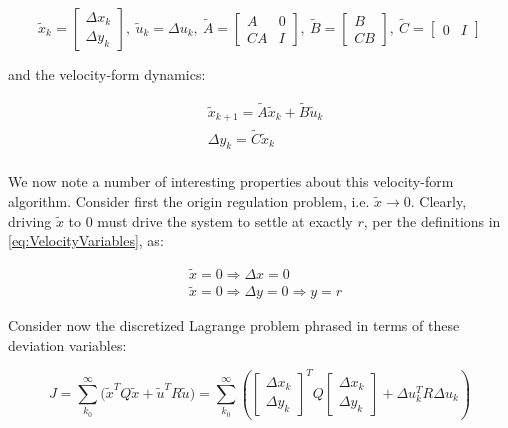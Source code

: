 \begin{equation}\label{eq:VelocityMatrices}
	\tilde{x}_k = \begin{bmatrix} \Delta x_k \\ \Delta y_k	\end{bmatrix}, \ \tilde{u}_k = \Delta u_k, \
	\tilde{A} = \begin{bmatrix} A & 0 \\ CA & I	\end{bmatrix}, \ 
	\tilde{B} = \begin{bmatrix} B \\ CB	\end{bmatrix}, \ \tilde{C} = \begin{bmatrix} 0 & I	\end{bmatrix}
\end{equation}

and the velocity-form dynamics:

\begin{align}\label{eq:VelocityDynamics}
	&\tilde{x}_{k+1} = \tilde{A}\tilde{x}_k + \tilde{B}\tilde{u}_k \\
	&\Delta y_k = \tilde{C}\tilde{x}_k \\
\end{align}

We now note a number of interesting properties about this velocity-form algorithm. Consider first the origin regulation problem, i.e. $\tilde{x} \rightarrow 0$. Clearly, driving $\tilde{x}$ to $0$ must drive the system to settle at exactly $r$, per the definitions in \cref{eq:VelocityVariables}, as:

\begin{equation}\label{eq:VelocityDriveToOrigin}
	\begin{split}
		&\tilde{x} = 0 \Rightarrow \Delta x = 0 \\ 
		&\tilde{x} = 0 \Rightarrow \Delta y = 0 \Rightarrow y = r
	\end{split}
\end{equation}

Consider now the discretized Lagrange problem phrased in terms of these deviation variables:

\begin{equation}\label{eq:LagrangeProblemDeviation}
	J = \sum_{k_0}^{\infty} \big(\tilde{x}^TQ\tilde{x} + \tilde{u}^TR\tilde{u}\big) = \sum_{k_0}^{\infty}\left( \begin{bmatrix} \Delta x_k \\ \Delta y_k\end{bmatrix}^T Q
	\begin{bmatrix} \Delta x_k \\ \Delta y_k\end{bmatrix} + 
	\Delta u_k^TR\Delta u_k \right)
\end{equation} 

